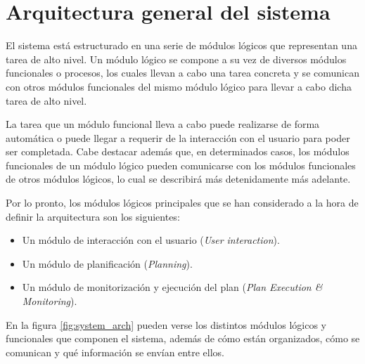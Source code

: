 
\chapter{Arquitectura general del sistema}

El sistema está estructurado en una serie de módulos lógicos que representan una
tarea de alto nivel. Un módulo lógico se compone a su vez de diversos módulos
funcionales o procesos, los cuales llevan a cabo una tarea concreta y se comunican con
otros módulos funcionales del mismo módulo lógico para llevar a cabo dicha tarea de alto
nivel.

La tarea que un módulo funcional lleva a cabo puede realizarse de forma automática o
puede llegar a requerir de la interacción con el usuario para poder ser completada.
Cabe destacar además que, en determinados casos, los módulos funcionales de un módulo
lógico pueden comunicarse con los módulos funcionales de otros módulos lógicos, lo cual se
describirá más detenidamente más adelante.

Por lo pronto, los módulos lógicos principales que se han considerado a la hora de definir
la arquitectura son los siguientes:

\begin{itemize}[label=\textbullet]
    \item Un módulo de interacción con el usuario (\textit{User interaction}).
    \item Un módulo de planificación (\textit{Planning}).
    \item Un módulo de monitorización y ejecución del plan (\textit{Plan Execution \& Monitoring}).
\end{itemize}

En la figura \ref{fig:system_arch} pueden verse los distintos módulos lógicos y funcionales que
componen el sistema, además de cómo están organizados, cómo se comunican y qué información se
envían entre ellos.

